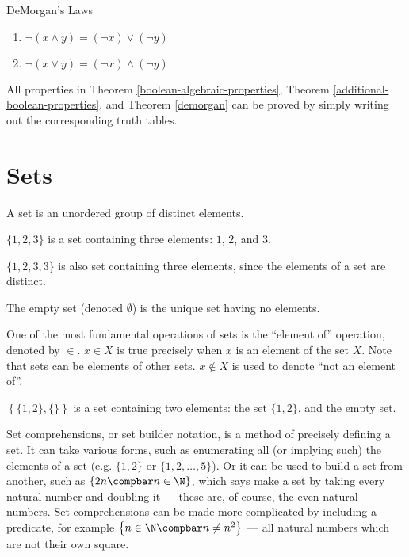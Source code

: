 \documentclass[12pt]{article}
\begin{document}
\begin{thm}{DeMorgan's Laws}\label{demorgan}\proofbreak
    \begin{enumerate}
        \item $\neg(x \land y) = (\neg x) \lor (\neg y)$
        \item $\neg(x \lor y) = (\neg x) \land (\neg y)$
    \end{enumerate}
\end{thm}

\begin{rmk}
    All properties in Theorem \ref{boolean-algebraic-properties}, Theorem \ref{additional-boolean-properties}, and Theorem \ref{demorgan} can be proved by simply writing out the corresponding truth tables.
\end{rmk}

\section{Sets}

\begin{defn}\label{set}
    A set is an unordered group of distinct elements.
\end{defn}

\begin{exmp}
    $\{1, 2, 3\}$ is a set containing three elements: $1$, $2$, and $3$.
\end{exmp}

\begin{note}
    $\{1, 2, 3, 3\}$ is also set containing three elements, since the elements of a set are distinct.
\end{note}

\begin{defn}\label{empty-set}
    The empty set (denoted $\emptyset$) is the unique set having no elements.
\end{defn}

One of the most fundamental operations of sets is the ``element of'' operation, denoted by $\in$. $x \in X$ is true precisely when $x$ is an element of the set $X$. Note that sets can be elements of other sets. $x \notin X$ is used to denote ``not an element of''.

\begin{exmp}
    $\left\{\{1, 2\}, \{\}\right\}$ is a set containing two elements: the set $\{1, 2\}$, and the empty set.
\end{exmp}

Set comprehensions, or set builder notation, is a method of precisely defining a set. It can take various forms, such as enumerating all (or implying such) the elements of a set (e.g. $\{1, 2\}$ or $\{1, 2, \ldots, 5\}$). Or it can be used to build a set from another, such as $\left\{2n \compbar n \in \N\right\}$, which says make a set by taking every natural number and doubling it --- these are, of course, the even natural numbers. Set comprehensions can be made more complicated by including a predicate, for example $\left\{n \in \N \compbar n \neq n^2 \right\}$ --- all natural numbers which are not their own square.
\end{document}
